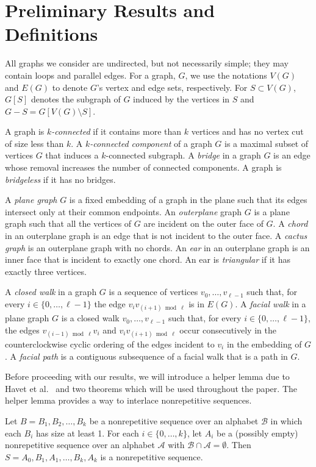 \documentclass{patmorin}
\begin{document}
\section{Preliminary Results and Definitions}

All graphs we consider are undirected, but not necessarily simple;
they may contain loops and parallel edges.  For a graph, $G$, we use
the notations $V(G)$ and $E(G)$ to denote $G$'s vertex and edge sets,
respectively. For $S\subset V(G)$, $G[S]$ denotes the subgraph of $G$
induced by the vertices in $S$ and $G-S=G[V(G)\setminus S]$.

A graph is \emph{$k$-connected} if it contains more than $k$ vertices
and has no vertex cut of size less than $k$.  A \emph{$k$-connected
component} of a graph $G$ is a maximal subset of vertices $G$ that
induces a $k$-connected subgraph.  A \emph{bridge} in a graph $G$ is an
edge whose removal increases the number of connected components.
A graph is \emph{bridgeless} if it has no bridges.

A \emph{plane graph} $G$ is a fixed embedding of a graph in the
plane such that its edges intersect only at their common endpoints. An
\emph{outerplane} graph $G$ is a plane graph such that all the vertices
of $G$ are incident on the outer face of $G$. A \emph{chord} in an
outerplane graph is an edge that is not incident to the outer face. A
\emph{cactus graph} is an outerplane graph with no chords.  An \emph{ear}
in an outerplane graph is an inner face that is incident to exactly one
chord. An ear is \emph{triangular} if it has exactly three vertices.

A \emph{closed walk} in a graph $G$ is a sequence of vertices
$v_0,\ldots,v_{\ell-1}$ such that, for every $i\in\{0,\ldots,\ell-1\}$
the edge $v_iv_{(i+1)\bmod \ell}$ is in $E(G)$.
A \emph{facial walk} in a plane graph $G$ is a closed walk
$v_0,\ldots,v_{\ell-1}$ such that, for every $i\in\{0,\ldots,\ell-1\}$,
the edges $v_{(i-1)\bmod \ell} v_i$ and $v_iv_{(i+1)\bmod\ell}$ occur
consecutively in the counterclockwise cyclic ordering of the edges
incident to $v_i$ in the embedding of $G$.  A \emph{facial path} is a
contiguous subsequence of a facial walk that is a path in $G$.

Before proceeding with our results, we will introduce a helper lemma
due to Havet et al.~\cite{havet2011facial} and two theorems which
will be used throughout the paper. The helper lemma provides a way to
interlace nonrepetitive sequences.

\begin{lem}
  Let $B=B_1,B_2,\ldots,B_k$ be a nonrepetitive sequence over an alphabet
  $\mathcal{B}$ in which each $B_i$ has size at least 1. For each $i
  \in \{0,\ldots,k\}$, let $A_i$ be a (possibly empty) nonrepetitive
  sequence over an alphabet $\mathcal{A}$ with $\mathcal{B} \cap
  \mathcal{A} = \emptyset$. Then $S = A_0, B_1, A_1, \ldots, B_k, A_k$
  is a nonrepetitive sequence.
\end{lem}
\end{document}
